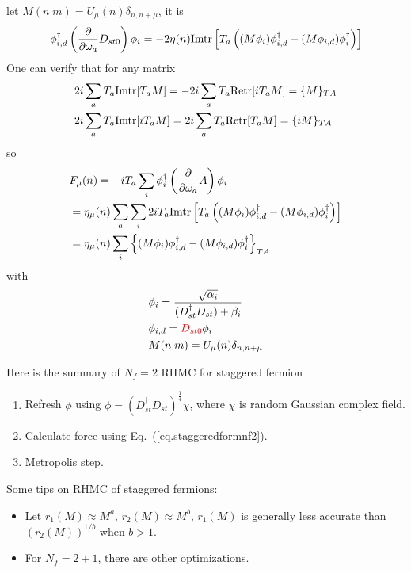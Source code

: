 let $M(n|m)=U_{\mu}(n) \delta _{n,n+\mu}$, it is
\begin{equation}
\begin{split}
&\phi _{i,d}^{\dagger}\left(\frac{\partial }{\partial \omega _a}D_{st0}\right)\phi _i = -2\eta (n) {\rm Imtr}\left[T_a\left((M\phi _i)\phi _{i,d}^{\dagger} - (M\phi _{i,d})\phi _i^{\dagger}\right)\right]\\
\end{split}
\end{equation}
One can verify that for any matrix \textcolor[rgb]{0,0,1}{
\begin{equation}
\begin{split}
&2i \sum _a T_a {\rm Im tr}[T_a M] = -2 i \sum _a T_a {\rm Re tr}[i T_a M] = \{M\}_{TA}\\
&2i \sum _a T_a {\rm Im tr}[i T_a M] = 2 i \sum _a T_a {\rm Re tr}[T_a M] = \{i M\}_{TA}\\
\end{split}
\end{equation}
}
so
\begin{equation}
\begin{split}
&F_{\mu}(n)=-iT_a \sum _i \phi _{i}^{\dagger} \left(\frac{\partial }{\partial \omega _a} A \right) \phi _{i}\\
&=\eta _{\mu}(n) \sum _a \sum _i 2i T_a{\rm Imtr}\left[T_a\left((M\phi _i)\phi _{i,d}^{\dagger} - (M\phi _{i,d})\phi _i^{\dagger}\right)\right]\\
&=\eta _{\mu}(n) \sum _i \left\{(M\phi _i)\phi _{i,d}^{\dagger} - (M\phi _{i,d})\phi _i^{\dagger}\right\}_{TA}
\end{split}
\label{eq.staggeredformnf2}
\end{equation}
with
\begin{equation}
\begin{split}
&\phi _i = \frac{\sqrt{\alpha _i} }{(D_{st}^{\dagger}D_{st})+\beta _i} \\
&\phi _{i,d}=\textcolor[rgb]{1,0,0}{D_{st0}}\phi _i\\
&M(n|m)=U_{\mu}(n) \delta _{n,n+\mu}\\
\end{split}
\end{equation}

Here is the summary of $N_f=2$ RHMC for staggered fermion
\begin{enumerate}
  \item Refresh $\phi$ using $\phi = (D_{st}^{\dagger}D_{st})^{\frac{1}{4}}\chi$, where $\chi$ is random Gaussian complex field.
  \item Calculate force using Eq.~(\ref{eq.staggeredformnf2}).
  \item Metropolis step.
\end{enumerate}

Some tips on RHMC of staggered fermions:

\begin{itemize}
  \item Let $r_1(M)\approx M^{a}$, $r_2(M)\approx M^{b}$, $r_1(M)$ is generally less accurate than $(r_2(M))^{1/b}$ when $b>1$.
  \item For $N_f=2+1$, there are other optimizations.
\end{itemize}
